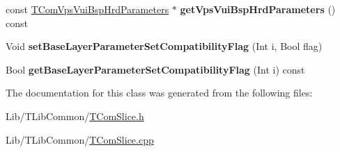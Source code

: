 \begin{DoxyCompactItemize}
\item 
\mbox{\label{class_t_com_v_p_s_v_u_i_ad8626b5e1193b28994e7c779775e6ad4}} 
const \hyperlink{class_t_com_vps_vui_bsp_hrd_parameters}{T\+Com\+Vps\+Vui\+Bsp\+Hrd\+Parameters} $\ast$ {\bfseries get\+Vps\+Vui\+Bsp\+Hrd\+Parameters} () const
\item 
\mbox{\label{class_t_com_v_p_s_v_u_i_a9eb2e44badb14a2698f0c0089d0839b2}} 
Void {\bfseries set\+Base\+Layer\+Parameter\+Set\+Compatibility\+Flag} (Int i, Bool flag)
\item 
\mbox{\label{class_t_com_v_p_s_v_u_i_ac246c0dec66e8e926ded35015d805d4d}} 
Bool {\bfseries get\+Base\+Layer\+Parameter\+Set\+Compatibility\+Flag} (Int i) const
\end{DoxyCompactItemize}


The documentation for this class was generated from the following files\+:\begin{DoxyCompactItemize}
\item 
Lib/\+T\+Lib\+Common/\hyperlink{_t_com_slice_8h}{T\+Com\+Slice.\+h}\item 
Lib/\+T\+Lib\+Common/\hyperlink{_t_com_slice_8cpp}{T\+Com\+Slice.\+cpp}\end{DoxyCompactItemize}
